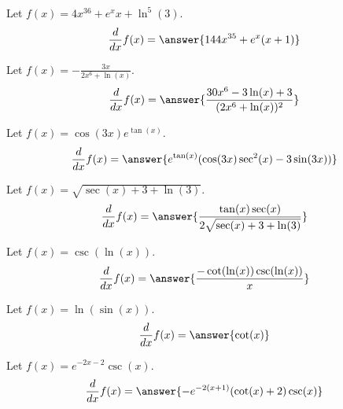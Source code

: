 \documentclass{ximera}
\begin{document}
\begin{shuffle}
\begin{exercise}
Let $f(x)=4 x^{36}+e^x x+\ln ^5(3)$.
\[
\ddx f(x) = \answer{144 x^{35}+e^x (x+1)}
\]
\end{exercise}



\begin{exercise}
Let $f(x)=-\frac{3 x}{2 x^6+\ln (x)}$.
\[
\ddx f(x) = \answer{\frac{30 x^6-3 \ln (x)+3}{(2 x^6+\ln (x))^2}}
\]
\end{exercise}

\begin{exercise}
Let $f(x)=\cos (3 x) e^{\tan (x)}$.
\[
\ddx f(x) = \answer{e^{\tan (x)} (\cos (3 x) \sec ^2(x)-3 \sin (3 x))}
\]
\end{exercise}

\begin{exercise}
Let $f(x)=\sqrt{\sec (x)+3+\ln (3)}$.
\[
\ddx f(x) = \answer{\frac{\tan (x) \sec (x)}{2 \sqrt{\sec (x)+3+\ln (3)}}}
\]
\end{exercise}

\begin{exercise}
Let $f(x)=\csc (\ln (x))$.
\[
\ddx f(x) = \answer{\frac{-\cot (\ln (x)) \csc (\ln (x))}{x}}
\]
\end{exercise}

\begin{exercise}
Let $f(x)=\ln (\sin (x))$.
\[
\ddx f(x) = \answer{\cot (x)}
\]
\end{exercise}

\begin{exercise}
Let $f(x)=e^{-2 x-2} \csc (x)$.
\[
\ddx f(x) = \answer{-e^{-2 (x+1)} (\cot (x)+2) \csc (x)}
\]
\end{exercise}



\end{shuffle}
\end{document}

